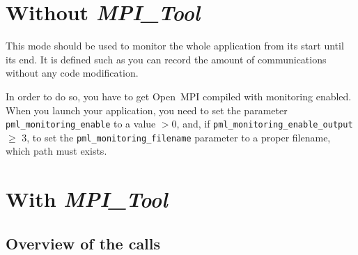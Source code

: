 \documentclass[notitlepage]{article}
\newcommand{\mpit}[1]{\textit{MPI\_Tool#1}}
\begin{document}
\section{Without \mpit{}}

This mode should be used to monitor the whole application from
its start until its end. It is defined such as you can record the
amount of communications without any code modification.

In order to do so, you have to get Open~MPI compiled with monitoring
enabled. When you launch your application, you need to set the
parameter \texttt{pml\_monitoring\_enable} to a value $> 0$, and, if
\texttt{pml\_monitoring\_enable\_output} $\ge$ 3, to set the
\texttt{pml\_monitoring\_filename} parameter to a proper filename,
which path must exists.

\section{With \mpit{}}

\subsection{Overview of the calls}
\end{document}

